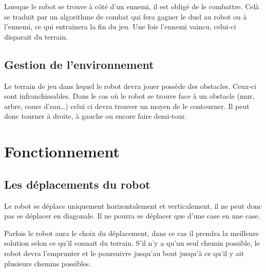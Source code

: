 \documentclass[a4paper 12pts]{article}
\begin{document}
Lorsque le robot se trouve à côté d'un ennemi, il est obligé de le combattre. Celà se traduit par un algorithme de combat qui fera gagner le duel au robot ou à l'ennemi, ce qui entrainera la fin du jeu. Une fois l'ennemi vaincu, celui-ci disparait du terrain.

\subsection{Gestion de l'environnement}
Le terrain de jeu dans lequel le robot devra jouer possède des obstacles. Ceux-ci sont infranchissables. Dans le cas où le robot se trouve face à un obstacle (mur, arbre, cours d'eau\ldots) celui ci devra trouver un moyen de le contourner. Il peut donc tourner à droite, à gauche ou encore faire demi-tour.


\section{Fonctionnement}

\subsection{Les déplacements du robot}
Le robot se déplace uniquement horizontalement et verticalement, il ne peut donc pas se déplacer en diagonale. Il ne pourra se déplacer que d'une case en une case.

Parfois le robot aura le choix du déplacement, dans ce cas il prendra la meilleure solution selon ce qu'il connait du terrain. S'il n'y a qu'un seul chemin possible, le robot devra l'emprunter et le poursuivre jusqu'au bout jusqu'à ce qu'il y ait plusieurs chemins possibles.
\end{document}
